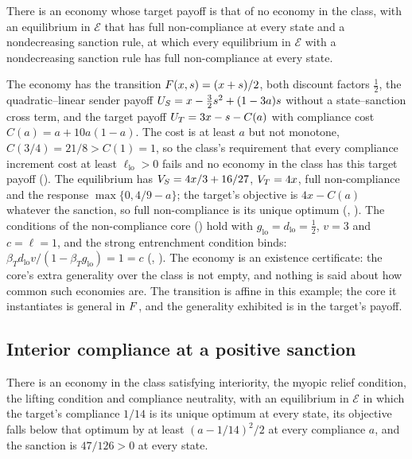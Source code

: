 \begin{proposition}
\label{prop:core-outside-chord}
There is an economy whose target payoff is that of no economy in the class, with an
equilibrium in $\mathcal E$ that has full non-compliance at every state and a nondecreasing
sanction rule, at which every equilibrium in $\mathcal E$ with a nondecreasing sanction
rule has full non-compliance at every state.
\end{proposition}

The economy has the transition $F(x,s)=(x+s)/2$, both discount factors $\tfrac12$, the
quadratic--linear sender payoff $U_S=x-\tfrac32s^2+(1-3a)s$ without a state--sanction cross term, and the
target payoff $U_T=3x-s-C(a)$ with compliance cost $C(a)=a+10a(1-a)$. The cost is at
least $a$ but not monotone, $C(3/4)=21/8>C(1)=1$, so the class's requirement that
every compliance increment cost at least $\ell_{\mathrm{lo}}>0$ fails and no economy
in the class has this target payoff (). The equilibrium has
$V_S=4x/3+16/27$, $V_T=4x$, full non-compliance and the response $\max\{0,4/9-a\}$; the
target's objective is $4x-C(a)$ whatever the sanction, so full non-compliance is its unique
optimum (, ). The conditions of the non-compliance
core () hold with $g_{\mathrm{lo}}=d_{\mathrm{lo}}=\tfrac12$,
$v=3$ and $c=\ell=1$, and the strong entrenchment condition binds:
$\beta_Td_{\mathrm{lo}}v/(1-\beta_Tg_{\mathrm{lo}})=1=c$ (,
). The economy is an existence certificate: the
core's extra generality over the class is not empty, and nothing is said about how
common such economies are. The transition is affine in this example; the core it
instantiates is general in $F$, and the generality exhibited is in the target's payoff.

\subsection{Interior compliance at a positive sanction}
\label{app:witness:interior}

\begin{proposition}
\label{prop:interior-witness}
There is an economy in the class satisfying interiority, the
myopic relief condition, the lifting condition and compliance neutrality, with an
equilibrium in $\mathcal E$ in which the target's compliance $1/14$ is its unique optimum at every
state, its objective falls below that optimum by at least $(a-1/14)^2/2$ at every
compliance $a$, and the sanction is $47/126>0$ at every state.
\end{proposition}

